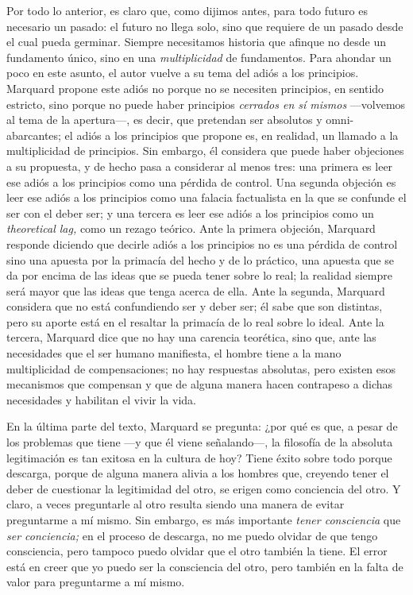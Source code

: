 \begin{refsection}
Por todo lo anterior, es claro que, como dijimos antes, para todo futuro es necesario un pasado: el futuro no llega solo, sino que requiere de un pasado desde el cual pueda germinar. Siempre necesitamos historia que afinque no desde un fundamento único, sino en una \emph{multiplicidad} de fundamentos. Para ahondar un poco en este asunto, el autor vuelve a su tema del adiós a los principios. Marquard propone este adiós no porque no se necesiten principios, en sentido estricto, sino porque no puede haber principios \emph{cerrados en sí mismos} ---volvemos al tema de la apertura---, es decir, que pretendan ser absolutos y omni-abarcantes; el adiós a los principios que propone es, en realidad, un llamado a la multiplicidad de principios. Sin embargo, él considera que puede haber objeciones a su propuesta, y de hecho pasa a considerar al menos tres: una primera es leer ese adiós a los principios como una pérdida de control. Una segunda objeción es leer ese adiós a los principios como una falacia factualista en la que se confunde el ser con el deber ser; y una tercera es leer ese adiós a los principios como un \emph{theoretical lag,} como un rezago teórico. Ante la primera objeción, Marquard responde diciendo que decirle adiós a los principios no es una pérdida de control sino una apuesta por la primacía del hecho y de lo práctico, una apuesta que se da por encima de las ideas que se pueda tener sobre lo real; la realidad siempre será mayor que las ideas que tenga acerca de ella. Ante la segunda, Marquard considera que no está confundiendo ser y deber ser; él sabe que son distintas, pero su aporte está en el resaltar la primacía de lo real sobre lo ideal. Ante la tercera, Marquard dice que no hay una carencia teorética, sino que, ante las necesidades que el ser humano manifiesta, el hombre tiene a la mano multiplicidad de compensaciones; no hay respuestas absolutas, pero existen esos mecanismos que compensan y que de alguna manera hacen contrapeso a dichas necesidades y habilitan el vivir la vida.

En la última parte del texto, Marquard se pregunta: ¿por qué es que, a pesar de los problemas que tiene ---y que él viene señalando---, la filosofía de la absoluta legitimación es tan exitosa en la cultura de hoy? Tiene éxito sobre todo porque descarga, porque de alguna manera alivia a los hombres que, creyendo tener el deber de cuestionar la legitimidad del otro, se erigen como conciencia del otro. Y claro, a veces preguntarle al otro resulta siendo una manera de evitar preguntarme a mí mismo. Sin embargo, es más importante \emph{tener consciencia} que \emph{ser conciencia;} en el proceso de descarga, no me puedo olvidar de que tengo consciencia, pero tampoco puedo olvidar que el otro también la tiene. El error está en creer que yo puedo ser la consciencia del otro, pero también en la falta de valor para preguntarme a mí mismo.


\end{refsection}
